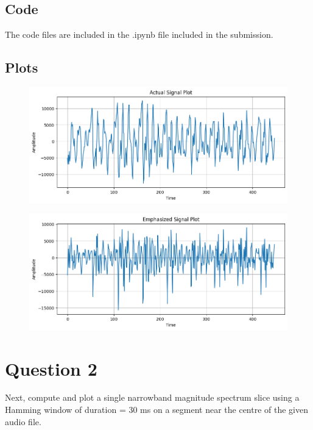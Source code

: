 \documentclass{article}
\begin{document}
\subsection{Code}
The code files are included in the .ipynb file included in the submission.

\subsection{Plots}

\begin{figure}[H]
\begin{center}
\includegraphics[scale = 0.5]{actual.png}
\end{center}
\end{figure}

\begin{figure}[H]
\begin{center}
\includegraphics[scale = 0.5]{emph.png}
\end{center}
\end{figure}


\section{Question 2}

Next, compute and plot a single narrowband magnitude spectrum slice using a Hamming window of duration = 30 ms on a segment near the centre of the given audio file.
\end{document}
